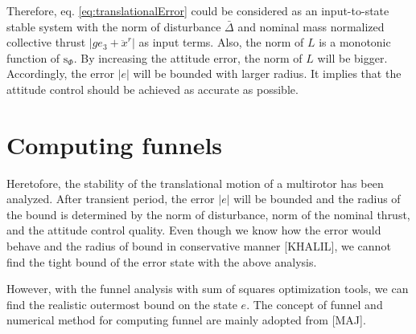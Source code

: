 \documentclass[letterpaper, 10 pt, conference]{ieeeconf}  %
\begin{document}
Therefore, eq. \eqref{eq:translationalError} could be considered as an input-to-state stable system with the norm of disturbance $\bar{\Delta}$ and nominal mass normalized collective thrust $|ge_3 + \ddot{x}^r|$ as input terms.
Also, the norm of $L$ is a monotonic function of $\text{s}_\Phi$. By increasing the attitude error, the norm of $L$ will be bigger. 
Accordingly, the error $|e|$ will be bounded with larger radius. 
It implies that the attitude control should be achieved as accurate as possible. 

\section{Computing funnels}
Heretofore, the stability of the translational motion of a multirotor has been analyzed. 
After transient period, the error $|e|$ will be bounded and the radius of the bound is determined by the norm of disturbance, norm of the nominal thrust, and the attitude control quality. 
Even though we know how the error would behave and the radius of bound in conservative manner [KHALIL], we cannot find the tight bound of the error state with the above analysis. 

However, with the funnel analysis with sum of squares optimization tools, we can find the realistic outermost bound on the state $e$.
The concept of funnel and numerical method for computing funnel are mainly adopted from [MAJ]. 
\end{document}

